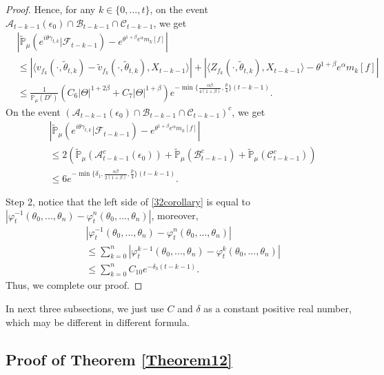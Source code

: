 \documentclass[12pt,oneside,english]{amsart}
\theoremstyle{plain}
\theoremstyle{definition}
\numberwithin{equation}{section}
\begin{document}
\begin{proof}
Hence, for any $k\in\{0,...,t\}$, on the event $\mathcal{A}_{t-k-1}(\epsilon_0)\cap\mathcal{B}_{t-k-1}\cap\mathcal{C}_{t-k-1}$, we get
\begin{align*}
   &\left|\mathbb{\tilde{P}}_{\mu}\left(e^{i\theta \gamma_{t,k}}|\mathscr{F}_{t-k-1}\right)-e^{\theta^{1+\beta}e^{\alpha}m_k[f]}\right|\\
   &\leq \left|\langle v_{f_k}(\cdot,\tilde{\theta}_{t,k})-\tilde{v}_{f_k}(\cdot,\tilde{\theta}_{t,k}), X_{t-k-1}\rangle\right|
   +\left|\langle Z_{f_k}(\cdot,\tilde{\theta}_{t,k}),X_{t-k-1}\rangle-\theta^{1+\beta}e^{\alpha}m_k[f]\right|\\
   &\leq \frac{1}{\mathbb{P}_{\mu}(D^c)}(C_6|\Theta|^{1+2\beta}+C_7|\Theta|^{1+\beta}) e^{-\min\{\frac{\alpha\beta}{4(1+\beta)},\frac{p}{4}\}(t-k-1)}.
\end{align*}
On the event $(\mathcal{A}_{t-k-1}(\epsilon_0)\cap\mathcal{B}_{t-k-1}\cap\mathcal{C}_{t-k-1})^c$, we get
\begin{align*}
    &\left|\mathbb{\tilde{P}}_{\mu}\left(e^{i\theta \gamma_{t,k}}|\mathscr{F}_{t-k-1}\right)-e^{\theta^{1+\beta}e^{\alpha}m_k[f]}\right|\\
    &\leq 2(\mathbb{\tilde{P}}_{\mu}(\mathcal{A}^c_{t-k-1}(\epsilon_0))+\mathbb{\tilde{P}}_{\mu}(\mathcal{B}^c_{t-k-1})+\mathbb{\tilde{P}}_{\mu}(\mathcal{C}^c_{t-k-1}))\\
    &\leq 6e^{-\min\{\delta_1,\frac{\alpha\beta}{2(1+\beta)},\frac{p}{4}\}(t-k-1)}.
\end{align*}

Step 2, notice that the left side of \eqref{32corollary} is equal to $\left|\varphi^{-1}_t(\theta_0,...,\theta_n)-\varphi^{n}_t(\theta_0,...,\theta_n)\right|$, moreover,
\begin{align}
    &\left|\varphi^{-1}_t(\theta_0,...,\theta_n)-\varphi^{n}_t(\theta_0,...,\theta_n)\right|
    \\&\leq\sum_{k=0}^n\left|\varphi^{k-1}_t(\theta_0,...,\theta_n)-\varphi^{k}_t(\theta_0,...,\theta_n)\right|
    \\&\leq \sum_{k=0}^n C_{10} e^{-\delta_3(t-k-1)}.
\end{align}
Thus, we complete our proof.
\end{proof}


In next three subsections, we just use $C$ and $\delta$ as a constant positive real number, which may be different in different formula.
\subsection{Proof of Theorem \ref{Theorem12}}
\end{document}
